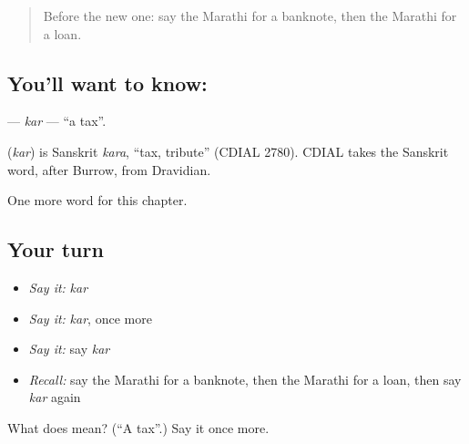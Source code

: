 \begin{quote}
Before the new one: say the Marathi for a banknote, then the Marathi for a loan.
\end{quote}

\subsection*{You'll want to know: }
\textbf{} — \emph{kar} — \textquotedblleft{}a tax\textquotedblright{}.

\begin{cousinweb}
\textbf{} (\emph{kar}) is Sanskrit \emph{kara}, \textquotedblleft{}tax, tribute\textquotedblright{} (CDIAL 2780). CDIAL takes the Sanskrit word, after Burrow, from Dravidian.
\end{cousinweb}

\begin{grammarlens}[title={What you've built}]
One more word for this chapter.
\end{grammarlens}

\subsection*{Your turn}
\begin{itemize}
\raggedright
  \item \emph{Say it:} \emph{kar}
  \item \emph{Say it:} \emph{kar}, once more
  \item \emph{Say it:} say \emph{kar}
  \item \emph{Recall:} say the Marathi for a banknote, then the Marathi for a loan, then say \emph{kar} again
\end{itemize}

\begin{tcolorbox}[breakable,colback=teal!4,colframe=teal!35!black,title={Before you move on}]
What does  mean? (\textquotedblleft{}A tax\textquotedblright{}.) Say it once more.
\end{tcolorbox}
